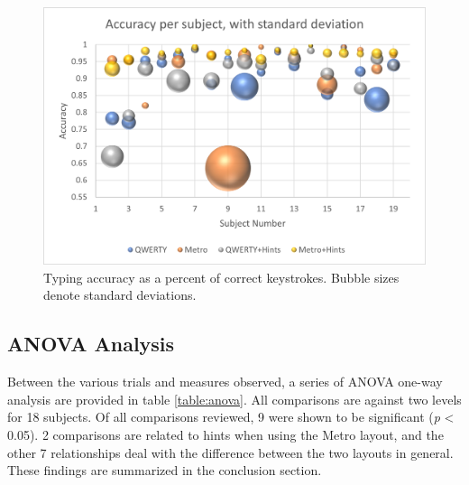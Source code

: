 \documentclass[english]{vgtc}
\begin{document}
\begin{figure}
  \centering
  \includegraphics[width=0.95\columnwidth]{accuracy.png}
  \caption{Typing accuracy as a percent of correct keystrokes. Bubble sizes denote standard deviations.}
  \label{fig:accuracy}
\end{figure}

\subsection{ANOVA Analysis}

Between the various trials and measures observed, a series of ANOVA one-way analysis are provided in table \ref{table:anova}. All comparisons are against two levels for 18 subjects.
Of all comparisons reviewed, 9 were shown to be significant (\emph{p} < 0.05). 2 comparisons are related to hints
when using the Metro layout, and the other 7 relationships deal with the difference between the two layouts in general.
These findings are summarized in the conclusion section.
\end{document}
